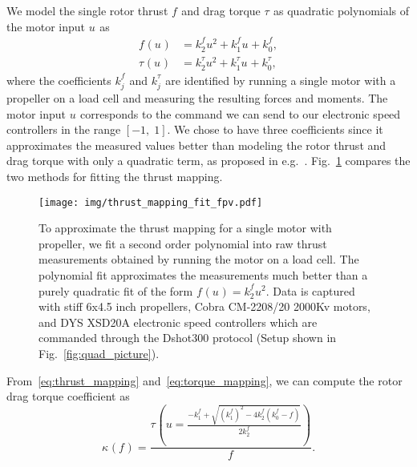 \documentclass[12pt,a4paper,fleqn]{article}
\newcommand{\rotthrust}[1]{f_{#1}}
\newcommand{\torquecoeff}[1]{\kappa_{#1}}
\newcommand{\rottorque}[1]{\tau_{#1}}
\newcommand{\motinput}[1]{u_{#1}}
\newcommand{\mapcoeff}[2]{k_{#2}^{#1}}
\begin{document}
We model the single rotor thrust $\rotthrust{}$ and drag torque $\rottorque{}$ as quadratic polynomials of the motor input $\motinput{}$ as
%
\begin{align}
	\rotthrust{}(\motinput{}) &= \mapcoeff{\rotthrust{}}{2} \motinput{}^2 + \mapcoeff{\rotthrust{}}{1} \motinput{} + \mapcoeff{\rotthrust{}}{0}, \label{eq:thrust_mapping}\\
	\rottorque{}(\motinput{}) &= \mapcoeff{\rottorque{}}{2} \motinput{}^2 + \mapcoeff{\rottorque{}}{1} \motinput{} + \mapcoeff{\rottorque{}}{0}, \label{eq:torque_mapping}
\end{align}
%
where the coefficients $\mapcoeff{\rotthrust{}}{j}$ and $\mapcoeff{\rottorque{}}{j}$ are identified by running a single motor with a propeller on a load cell and measuring the resulting forces and moments.
The motor input $\motinput{}$ corresponds to the command we can send to our electronic speed controllers in the range $[-1, \; 1]$.
We chose to have three coefficients since it approximates the measured values better than modeling the rotor thrust and drag torque with only a quadratic term, as proposed in e.g.~\cite{Michael10ram}. 
Fig.~\ref{fig:thrust_mapping_fit} compares the two methods for fitting the thrust mapping.
%
\begin{figure}[t]
   \centering
   \texttt{[image: img/thrust\_mapping\_fit\_fpv.pdf]}
   \caption{To approximate the thrust mapping for a single motor with propeller, we fit a second order polynomial into raw thrust measurements obtained by running the motor on a load cell. The polynomial fit approximates the measurements much better than a purely quadratic fit of the form $\rotthrust{}(\motinput{}) = \mapcoeff{\rotthrust{}}{2} \motinput{}^2$. Data is captured with stiff 6x4.5 inch propellers, Cobra CM-2208/20 2000Kv motors, and DYS XSD20A electronic speed controllers which are commanded through the Dshot300 protocol (Setup shown in Fig.~\ref{fig:quad_picture}).}
   \label{fig:thrust_mapping_fit}
\end{figure}
%
From~\eqref{eq:thrust_mapping} and~\eqref{eq:torque_mapping}, we can compute the rotor drag torque coefficient as
%
\begin{equation}
	 \torquecoeff{}(\rotthrust{}) = \frac{\rottorque{} \left( u = \frac{-\mapcoeff{\rotthrust{}}{1} + \sqrt{\left( \mapcoeff{\rotthrust{}}{1} \right)^2 - 4 \mapcoeff{\rotthrust{}}{2} \left( \mapcoeff{\rotthrust{}}{0} - \rotthrust{} \right)}}{2 \mapcoeff{\rotthrust{}}{2}} \right)}{\rotthrust{}}. 
	 \label{eq:rotor_drag_torque_coeff}
\end{equation}
\end{document}
